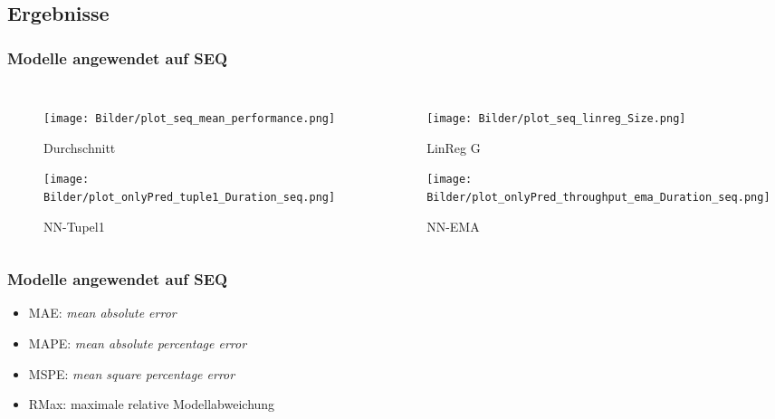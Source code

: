 \documentclass{beamer}
\begin{document}
\subsection{Ergebnisse}
\begin{frame}
	\frametitle{Modelle angewendet auf SEQ}
	\begin{columns}
		\begin{figure}
			\texttt{[image: Bilder/plot\_seq\_mean\_performance.png]}\\
			\vspace*{-0.45cm}
			\caption{Durchschnitt}
			\texttt{[image: Bilder/plot\_onlyPred\_tuple1\_Duration\_seq.png]}
			\vspace*{-0.45cm}
			\caption{NN-Tupel1}
		\end{figure}
		\begin{figure}
			\texttt{[image: Bilder/plot\_seq\_linreg\_Size.png]}\\
			\vspace*{-0.45cm}
			\caption{LinReg G}
			\texttt{[image: Bilder/plot\_onlyPred\_throughput\_ema\_Duration\_seq.png]}
			\vspace*{-0.45cm}
			\caption{NN-EMA}
		\end{figure}
	\end{columns}
\end{frame}

\begin{frame}
\frametitle{Modelle angewendet auf SEQ}
\begin{table}
\end{table}
\begin{itemize}
\item MAE: \textit{mean absolute error}
\item MAPE: \textit{mean absolute percentage error}
\item MSPE: \textit{mean square percentage error}
\item RMax: maximale relative Modellabweichung
\end{itemize}
\end{frame}
\end{document}
